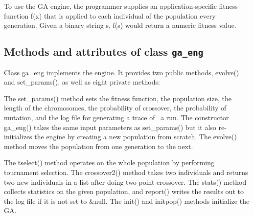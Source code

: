 To use the GA engine, the programmer supplies an application-specific
fitness function \textsf{f(x)} that is applied to each individual of
the population every generation. Given a binary string \textsf{s},
\textsf{f(s)} would return a numeric fitness value.

\subsection{Methods and attributes of class \texttt{ga\_eng}}

Class \textsf{ga\_eng} implements the engine. It provides
two public methods, \textsf{evolve()} and \textsf{set\_params()}, as
well as eight private methods: 


The \textsf{set\_params()} method sets the fitness function, the
population size, the length of the chromosomes, the probability of
crossover, the probability of mutation, and the log file for generating
a trace of \ a run. The constructor
\textsf{ga\_eng()} takes the same input parameters as
\textsf{set\_params()} but it also re-initializes the engine by
creating a new population from scratch. The \textsf{evolve()} method
moves the population from one generation to the next.

The \textsf{tselect()} method operates on the whole population by
performing tournament selection. The \textsf{crossover2()} method takes
two individuals and returns two new individuals in a list after doing
two-point crossover. The \textsf{stats()} method collects statistics on
the given population, and \textsf{report()} writes the results out to
the log file if it is not set to \textsf{\&null}. The \textsf{init()}
and \textsf{initpop()} methods initialize the GA.

